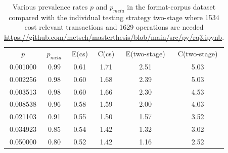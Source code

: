 \begin{table}[H]
    \caption{Various prevalence rates $p$ and $p_{meta}$ in the format-corpus dataset compared with the individual testing strategy \acrshort{two-stage} where 1534 cost relevant transactions and 1629 operations are needed \url{https://github.com/metsch/masterthesis/blob/main/src/py/rq3.ipynb}.}
    \centering
    \begin{tabular}{c c c c c c}
    \label{tb:split-off}
    $p$ & $p_{meta}$ & E(\acrshort{cs}) & C(\acrshort{cs}) & E(\acrshort{two-stage}) & C(\acrshort{two-stage})\\
    0.001000 & 0.99 & 0.61 & 1.71 & 2.51 & 5.03 \\
    0.002256 & 0.98 & 0.60 & 1.68 & 2.39 & 5.03 \\
    0.003513 & 0.98 & 0.60 & 1.66 & 2.30 & 4.53 \\
    0.008538 & 0.96 & 0.58 & 1.59 & 2.00 & 4.03 \\
    0.021103 & 0.91 & 0.55 & 1.50 & 1.57 & 3.52 \\
    0.034923 & 0.85 & 0.54 & 1.42 & 1.32 & 3.02 \\
    0.050000 & 0.80 & 0.52 & 1.42 & 1.16 & 2.52 \\
    \end{tabular}
\end{table}

